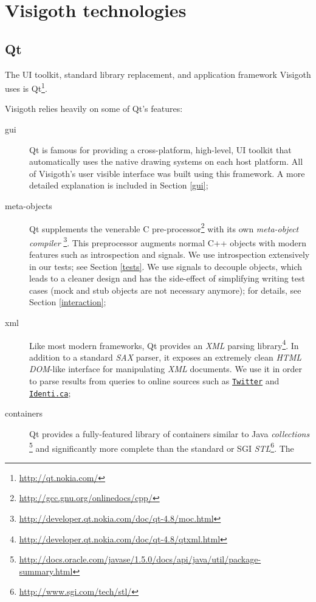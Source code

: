 \documentclass[a4paper,11pt,titlepage]{article}
\let\stdhref\href
\renewcommand{\href}[2]{\stdhref{#1}{\texttt{#2}}}
\let\stdsection\section         %
\renewcommand{\section}{\newpage\stdsection}
\newcommand{\buzz}[1]{\emph{#1}}
\begin{document}
\section{Visigoth technologies}

\subsection{Qt}

The UI toolkit, standard library replacement, and application
framework Visigoth uses is Qt\footnote{\url{http://qt.nokia.com/}}.

Visigoth relies heavily on some of Qt's features:
\begin{description}
\item [gui] Qt is famous for providing a cross-platform, high-level,
  UI toolkit that automatically uses the native drawing systems on
  each host platform. All of Visigoth's user visible interface was
  built using this framework. A more detailed explanation is included
  in Section \ref{gui};
\item [meta-objects] Qt supplements the venerable C
  pre-processor\footnote{\url{http://gcc.gnu.org/onlinedocs/cpp/}}
  with its own \buzz{meta-object
    compiler} \footnote{\url{http://developer.qt.nokia.com/doc/qt-4.8/moc.html}}.
  This preprocessor augments normal C++ objects with modern features
  such as introspection and signals. We use introspection extensively
  in our tests; see Section \ref{tests}. We use signals to decouple
  objects, which leads to a cleaner design and has the side-effect of
  simplifying writing test cases (mock and stub objects are not
  necessary anymore); for details, see Section \ref{interaction};
\item [xml] Like most modern frameworks, Qt provides an \buzz{XML}
  parsing
  library\footnote{\url{http://developer.qt.nokia.com/doc/qt-4.8/qtxml.html}}.
  In addition to a standard \buzz{SAX} parser, it exposes an extremely
  clean \buzz{HTML DOM}-like interface for manipulating \buzz{XML}
  documents. We use it in order to parse results from queries to
  online sources such as \href{http://twitter.com}{Twitter} and
  \href{http://identi.ca}{Identi.ca};
\item [containers] Qt provides a fully-featured library of containers
  similar to Java
  \buzz{collections} \footnote{\url{http://docs.oracle.com/javase/1.5.0/docs/api/java/util/package-summary.html}}
  and significantly more complete than the standard or SGI
  \buzz{STL}\footnote{\url{http://www.sgi.com/tech/stl/}}. The

\end{description}
\end{document}
